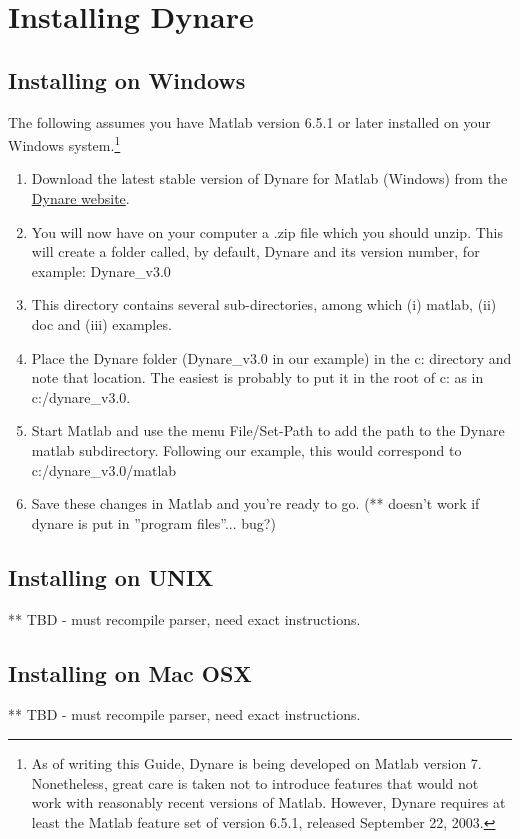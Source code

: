\section{Installing Dynare}
\subsection{Installing on Windows}
The following assumes you have Matlab version 6.5.1 or later installed on your Windows system.\footnote{As of writing this Guide, Dynare is being developed on Matlab version 7. Nonetheless, great care is taken not to introduce features that would not work with reasonably recent versions of Matlab. However, Dynare requires at least the Matlab feature set of version 6.5.1, released September 22, 2003.}
\begin{enumerate}
\item Download the latest stable version of Dynare for Matlab (Windows) from the \href{http://www.cepremap.cnrs.fr/juillard/mambo/index.php?option=com_frontpage&Itemid=1}{Dynare website}. 
\item You will now have on your computer a .zip file which you should unzip. This will create a folder called, by default, Dynare and its version number, for example: Dynare\_v3.0 
\item This directory contains several sub-directories, among which (i) matlab, (ii) doc and (iii) examples. 
\item Place the Dynare folder (Dynare\_v3.0 in our example) in the c: directory and note that location. The easiest is probably to put it in the root of c: as in c:/dynare\_v3.0.
\item Start Matlab and use the menu File/Set-Path to add the path to the Dynare 
matlab subdirectory. Following our example, this would correspond to 
c:/dynare\_v3.0/matlab
\item Save these changes in Matlab and you're ready to go. (** doesn't work if dynare is put in ''program files''... bug?)
\end{enumerate} 

\subsection{Installing on UNIX}
** TBD - must recompile parser, need exact instructions. 
\subsection{Installing on Mac OSX}
** TBD - must recompile parser, need exact instructions. 


